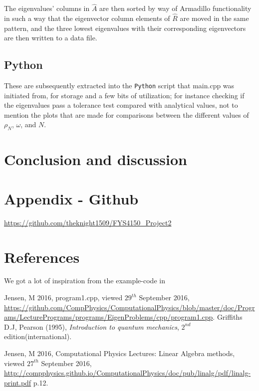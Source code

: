 \documentclass[11pt,a4paper,notitlepage]{article}
\begin{document}
The eigenvalues' columns in $\hat{A}$ are then sorted by way of Armadillo functionality in such a way that the eigenvector column elements of $\hat{R}$ are moved in the same pattern, and the three lowest eigenvalues with their corresponding eigenvectors are then written to a data file.

\subsection{Python}
These are subsequently extracted into the \verb|Python| script that main.cpp was initiated from, for storage and a few bits of utilization; for instance checking if the eigenvalues pass a tolerance test compared with analytical values, not to mention the plots that are made for comparisons between the different values of $\rho_N$, $\omega$, and $N$.

\section{Conclusion and discussion}
\section{Appendix - Github} \label{section:github}
\url{https://github.com/theknight1509/FYS4150_Project2}
\section{References}
We got a lot of inspiration from the example-code in \cite[web-site]{example_code}

\begin{thebibliography}{9}

  Jensen, M 2016,
  program1.cpp,
  viewed $29^{th}$ September 2016,
  \url{https://github.com/CompPhysics/ComputationalPhysics/blob/master/doc/Programs/LecturePrograms/programs/EigenProblems/cpp/program1.cpp}.
  Griffiths D.J, 
  Pearson (1995),
  \emph{Introduction to quantum mechanics},
  $2^{nd}$ edition(international).
  
	Jensen, M 2016, 
	Computational Physics Lectures: Linear
Algebra methods, 
	viewed $27^{th}$ September 2016, 
	\url{http://compphysics.github.io/ComputationalPhysics/doc/pub/linalg/pdf/linalg-print.pdf} p.12. 

\end{thebibliography}
\end{document}
